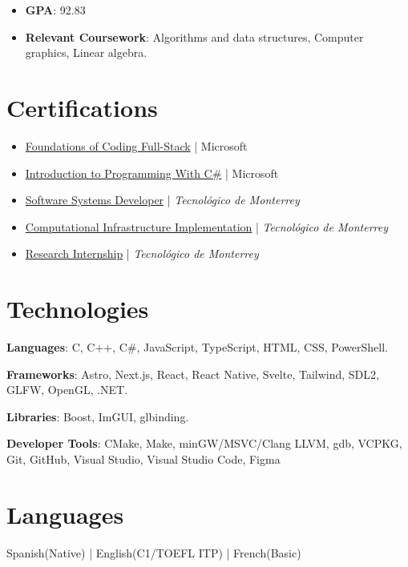 \documentclass[10pt,letterpaper]{article}
\begin{document}
\begin{itemize}
    \item \textbf{GPA}: 92.83
    \item \textbf{Relevant Coursework}: Algorithms and data structures, Computer graphics, Linear algebra.
\end{itemize}

\section{Certifications}

\begin{itemize}[topsep=0pt,itemsep=0pt,parsep=0pt,partopsep=0pt,leftmargin=*]
    \item \href{https://www.coursera.org/account/accomplishments/records/YRBFYOF8ZKB8}{Foundations of Coding Full-Stack} | Microsoft
    \item \href{https://www.coursera.org/account/accomplishments/verify/5C92VGE4SWFO}{Introduction to Programming With C\#} | Microsoft
    \item \href{https://api.badgr.io/public/assertions/MtqvVdKQSdmx8HospWE1aw}{Software Systems Developer} | \textit{Tecnológico de Monterrey}
    \item \href{https://api.badgr.io/public/assertions/EA0qVm6cRBykjIyOLQse7g}{Computational Infrastructure Implementation} | \textit{Tecnológico de Monterrey}
    \item \href{https://api.badgr.io/public/assertions/bE7-YqTpQM-ZdBLmjIq07Q}{Research Internship} | \textit{Tecnológico de Monterrey}
\end{itemize}

\section{Technologies}

\textbf{Languages}: C, C++, C\#, JavaScript, TypeScript, HTML, CSS, PowerShell.

\textbf{Frameworks}: Astro, Next.js, React, React Native, Svelte, Tailwind, SDL2, GLFW, OpenGL, .NET.

\textbf{Libraries}: Boost, ImGUI, glbinding.

\textbf{Developer Tools}: CMake, Make, minGW/MSVC/Clang LLVM, gdb, VCPKG, Git, GitHub, Visual Studio, Visual Studio Code, Figma

\section{Languages}
    Spanish(Native) | 
    English(C1/TOEFL ITP) | 
    French(Basic)
\end{document}
